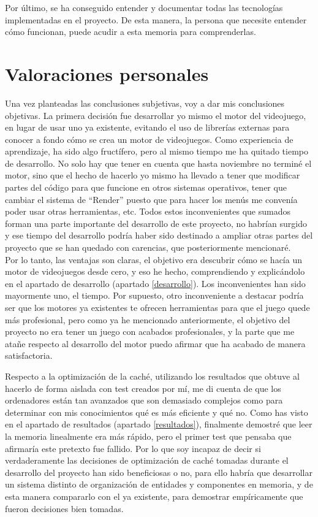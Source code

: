 Por último, se ha conseguido entender y documentar todas las tecnologías implementadas en el proyecto. De esta manera, la persona que necesite entender cómo funcionan, puede acudir a esta memoria para comprenderlas.

\section{Valoraciones personales}
Una vez planteadas las conclusiones subjetivas, voy a dar mis conclusiones objetivas. La primera decisión fue desarrollar yo mismo el motor del videojuego, en lugar de usar uno ya existente, evitando el uso de librerías externas para conocer a fondo cómo se crea un motor de videojuegos. Como experiencia de aprendizaje, ha sido algo fructífero, pero al mismo tiempo me ha quitado tiempo de desarrollo. No solo hay que tener en cuenta que hasta noviembre no terminé el motor, sino que el hecho de hacerlo yo mismo ha llevado a tener que modificar partes del código para que funcione en otros sistemas operativos, tener que cambiar el sistema de ``Render'' puesto que para hacer los menús me convenía poder usar otras herramientas, etc. Todos estos inconvenientes que sumados forman una parte importante del desarrollo de este proyecto, no habrían surgido y ese tiempo del desarrollo podría haber sido destinado a ampliar otras partes del proyecto que se han quedado con carencias, que posteriormente mencionaré. 
\\
Por lo tanto, las ventajas son claras, el objetivo era descubrir cómo se hacía un motor de videojuegos desde cero, y eso he hecho, comprendiendo y explicándolo en el apartado de desarrollo (apartado \ref{desarrollo}). Los inconvenientes han sido mayormente uno, el tiempo. Por supuesto, otro inconveniente a destacar podría ser que los motores ya existentes te ofrecen herramientas para que el juego quede más profesional, pero como ya he mencionado anteriormente, el objetivo del proyecto no era tener un juego con acabados profesionales, y la parte que me atañe respecto al desarrollo del motor puedo afirmar que ha acabado de manera satisfactoria.

Respecto a la optimización de la caché, utilizando los resultados que obtuve al hacerlo de forma aislada con test creados por mí, me di cuenta de que los ordenadores están tan avanzados que son demasiado complejos como para determinar con mis conocimientos qué es más eficiente y qué no. Como has visto en el apartado de resultados (apartado \ref{resultados}), finalmente demostré que leer la memoria linealmente era más rápido, pero el primer test que pensaba que afirmaría este pretexto fue fallido. Por lo que soy incapaz de decir si verdaderamente las decisiones de optimización de caché tomadas durante el desarrollo del proyecto han sido beneficiosas o no, para ello habría que desarrollar un sistema distinto de organización de entidades y componentes en memoria, y de esta manera compararlo con el ya existente, para demostrar empíricamente que fueron decisiones bien tomadas.

